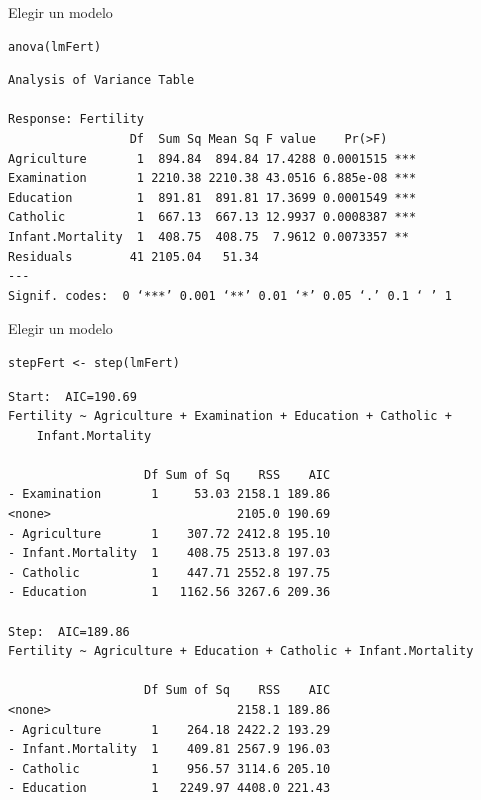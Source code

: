 \documentclass[xcolor={usenames,svgnames,dvipsnames}]{beamer}
\begin{document}
\begin{frame}[fragile,label=sec-3-10]{Elegir un modelo}
 \lstset{language=R,numbers=none}
\begin{lstlisting}
anova(lmFert)
\end{lstlisting}

\begin{verbatim}
Analysis of Variance Table

Response: Fertility
                 Df  Sum Sq Mean Sq F value    Pr(>F)    
Agriculture       1  894.84  894.84 17.4288 0.0001515 ***
Examination       1 2210.38 2210.38 43.0516 6.885e-08 ***
Education         1  891.81  891.81 17.3699 0.0001549 ***
Catholic          1  667.13  667.13 12.9937 0.0008387 ***
Infant.Mortality  1  408.75  408.75  7.9612 0.0073357 ** 
Residuals        41 2105.04   51.34                      
---
Signif. codes:  0 ‘***’ 0.001 ‘**’ 0.01 ‘*’ 0.05 ‘.’ 0.1 ‘ ’ 1
\end{verbatim}
\end{frame}
\begin{frame}[fragile,label=sec-3-11]{Elegir un modelo}
 \lstset{language=R,numbers=none}
\begin{lstlisting}
stepFert <- step(lmFert)
\end{lstlisting}

\begin{verbatim}
Start:  AIC=190.69
Fertility ~ Agriculture + Examination + Education + Catholic + 
    Infant.Mortality

                   Df Sum of Sq    RSS    AIC
- Examination       1     53.03 2158.1 189.86
<none>                          2105.0 190.69
- Agriculture       1    307.72 2412.8 195.10
- Infant.Mortality  1    408.75 2513.8 197.03
- Catholic          1    447.71 2552.8 197.75
- Education         1   1162.56 3267.6 209.36

Step:  AIC=189.86
Fertility ~ Agriculture + Education + Catholic + Infant.Mortality

                   Df Sum of Sq    RSS    AIC
<none>                          2158.1 189.86
- Agriculture       1    264.18 2422.2 193.29
- Infant.Mortality  1    409.81 2567.9 196.03
- Catholic          1    956.57 3114.6 205.10
- Education         1   2249.97 4408.0 221.43
\end{verbatim}
\end{frame}
\end{document}
